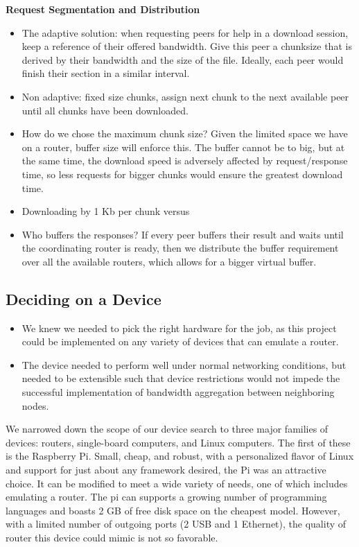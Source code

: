 \documentclass[12pt]{article}
\begin{document}
		{\bf Request Segmentation and Distribution}
		\begin{itemize}
			\item The adaptive solution: when requesting peers for help in a download session, keep a reference of their offered bandwidth. Give this peer a chunksize that is derived by their bandwidth and the size of the file. Ideally, each peer would finish their section in a similar interval.
			\item Non adaptive: fixed size chunks, assign next chunk to the next available peer until all chunks have been downloaded.
			\item How do we chose the maximum chunk size? Given the limited space we have on a router, buffer size will enforce this. The buffer cannot be to big, but at the same time, the download speed is adversely affected by request/response time, so less requests for bigger chunks would ensure the greatest download time.
			\item Downloading by 1 Kb per chunk versus 
			\item Who buffers the responses? If every peer buffers their result and waits until the coordinating router is ready, then we distribute the buffer requirement over all the available routers, which allows for a bigger virtual buffer.
		\end{itemize}

		{\bf }


	\subsection{Deciding on a Device}
		\begin{itemize}
			\item We knew we needed to pick the right hardware for the job, as this project could be implemented on any variety of devices that can emulate a router.
			\item The device needed to perform well under normal networking conditions, but needed to be extensible such that device restrictions would not impede the successful implementation of bandwidth aggregation between neighboring nodes.
		\end{itemize}

		We narrowed down the scope of our device search to three major families of devices: routers, single-board computers, and Linux computers. The first of these is the Raspberry Pi. Small, cheap, and robust, with a personalized flavor of Linux and support for just about any framework desired, the Pi was an attractive choice. It can be modified to meet a wide variety of needs, one of which includes emulating a router. The pi can supports a growing number of programming languages and boasts 2 GB of free disk space on the cheapest model. However, with a limited number of outgoing ports (2 USB and 1 Ethernet), the quality of router this device could mimic is not so favorable. \\
\end{document}

